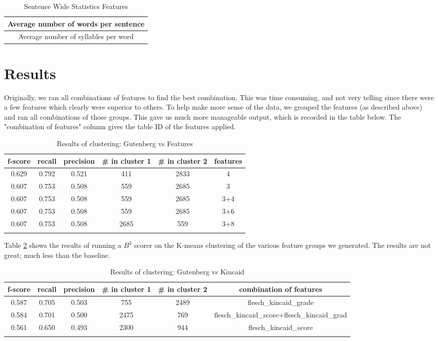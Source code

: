 \documentclass[]{article}
\begin{document}
\begin{table}[!htbp]
	\begin{center}
		\begin{tabular}{| c |} \hline
			Average number of words per sentence \\ \hline
      Average number of syllables per word \\ \hline
		\end{tabular}
	\end{center}
	\caption{Sentence Wide Statistics Features}
	\label{table:group6}
\end{table}


\section{Results}

Originally, we ran all combinations of features to find the best combination.
This was time consuming, and not very telling since there were a few features which clearly were superior to others.
To help make more sense of the data, we grouped the features (as described above) and ran all combinations of those groups.
This gave us much more manageable output, which is recorded in the table below.
The "combination of features" column gives the table ID of the features applied.

\begin{longtable}[!htbp]{| c | c | c | c | c | c |} \hline
		f-score & recall & precision & \# in cluster 1 & \# in cluster 2 & features\\
		\hline
		0.629 & 0.792 & 0.521 & 411 & 2833 & 4 \\
		0.607 & 0.753 & 0.508 & 559 & 2685 & 3 \\
		0.607 & 0.753 & 0.508 & 559 & 2685 & 3+4 \\
		0.607 & 0.753 & 0.508 & 559 & 2685 & 3+6 \\
		0.607 & 0.753 & 0.508 & 2685 & 559 & 3+8 \\  
		\hline
	\caption{Results of clustering: Gutenberg vs Features}
	\label{table:guternberg_vs_features}
\end{longtable}

Table \ref{table:guternberg_vs_features} shows the results of running a $B^3$ scorer on the K-means clustering of the various feature groups we generated.
The results are not great; much less than the baseline.

\begin{longtable}[!htbp]{| c | c | c | c | c | c |} \hline
	f-score & recall & precision & \# in cluster 1 & \# in cluster 2 & combination of features \\
	\hline
	0.587 & 0.705 & 0.503 & 755 & 2489 & flesch\_kincaid\_grade \\
	0.584 & 0.701 & 0.500 & 2475 & 769 & flesch\_kincaid\_score+flesch\_kincaid\_grad \\
	0.561 & 0.650 & 0.493 & 2300 & 944 & flesch\_kincaid\_score \\
\hline
	\caption{Results of clustering: Gutenberg vs Kincaid}
	\label{table:gutenberg_vs_kincaid}
\end{longtable}
\end{document}
